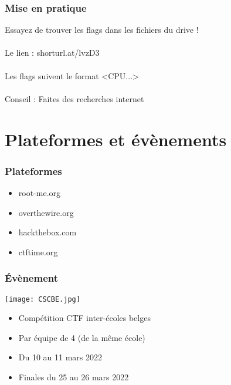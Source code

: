 \documentclass{beamer}
\begin{document}
\begin{frame}\frametitle{Mise en pratique}

Essayez de trouver les flags dans les fichiers du drive ! \\~\\

Le lien : shorturl.at/lvzD3 \\~\\

Les flags suivent le format <CPU...> \\~\\

Conseil : Faites des recherches internet


\end{frame}




\section{Plateformes et évènements}

\begin{frame}\frametitle{Plateformes}
    \begin{itemize}
        \item root-me.org
        \item overthewire.org
        \item hackthebox.com
        \item ctftime.org
    \end{itemize}
\end{frame}



\begin{frame}
\frametitle{Évènement}
\begin{center}
    \texttt{[image: CSCBE.jpg]}
\end{center}

\begin{itemize}
    \item Compétition CTF inter-écoles belges\\
    \item Par équipe de 4 (de la même école)\\
    \item Du 10 au 11 mars 2022
    \item Finales du 25 au 26 mars 2022
\end{itemize}

    
\end{frame}
\end{document}
